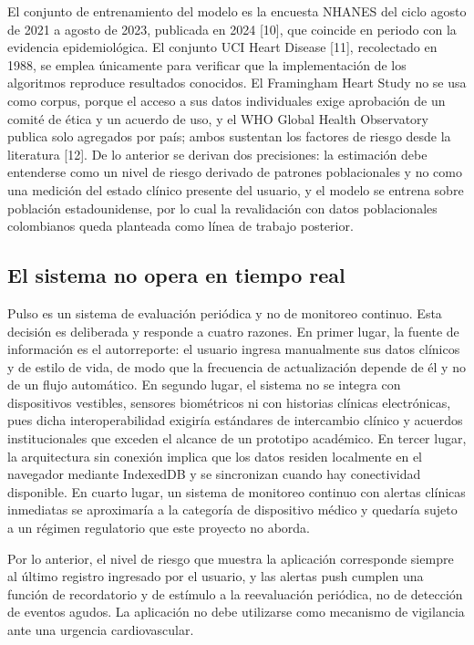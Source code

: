 \documentclass[conference]{IEEEtran}
\begin{document}
El conjunto de entrenamiento del modelo es la encuesta NHANES del ciclo agosto de 2021 a agosto de 2023, publicada en 2024 [10], que coincide en periodo con la evidencia epidemiológica. El conjunto UCI Heart Disease [11], recolectado en 1988, se emplea únicamente para verificar que la implementación de los algoritmos reproduce resultados conocidos. El Framingham Heart Study no se usa como corpus, porque el acceso a sus datos individuales exige aprobación de un comité de ética y un acuerdo de uso, y el WHO Global Health Observatory publica solo agregados por país; ambos sustentan los factores de riesgo desde la literatura [12]. De lo anterior se derivan dos precisiones: la estimación debe entenderse como un nivel de riesgo derivado de patrones poblacionales y no como una medición del estado clínico presente del usuario, y el modelo se entrena sobre población estadounidense, por lo cual la revalidación con datos poblacionales colombianos queda planteada como línea de trabajo posterior.

\subsection{El sistema no opera en tiempo real}
Pulso es un sistema de evaluación periódica y no de monitoreo continuo. Esta decisión es deliberada y responde a cuatro razones. En primer lugar, la fuente de información es el autorreporte: el usuario ingresa manualmente sus datos clínicos y de estilo de vida, de modo que la frecuencia de actualización depende de él y no de un flujo automático. En segundo lugar, el sistema no se integra con dispositivos vestibles, sensores biométricos ni con historias clínicas electrónicas, pues dicha interoperabilidad exigiría estándares de intercambio clínico y acuerdos institucionales que exceden el alcance de un prototipo académico. En tercer lugar, la arquitectura sin conexión implica que los datos residen localmente en el navegador mediante IndexedDB y se sincronizan cuando hay conectividad disponible. En cuarto lugar, un sistema de monitoreo continuo con alertas clínicas inmediatas se aproximaría a la categoría de dispositivo médico y quedaría sujeto a un régimen regulatorio que este proyecto no aborda.

Por lo anterior, el nivel de riesgo que muestra la aplicación corresponde siempre al último registro ingresado por el usuario, y las alertas push cumplen una función de recordatorio y de estímulo a la reevaluación periódica, no de detección de eventos agudos. La aplicación no debe utilizarse como mecanismo de vigilancia ante una urgencia cardiovascular.
\end{document}
